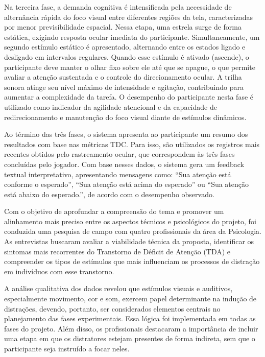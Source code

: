 Na terceira fase, a demanda cognitiva é intensificada pela necessidade de alternância rápida do foco visual entre diferentes regiões da tela, caracterizadas por menor previsibilidade espacial. Nessa etapa, uma estrela surge de forma estática, exigindo resposta ocular imediata do participante. Simultaneamente, um segundo estímulo estático é apresentado, alternando entre os estados ligado e desligado em intervalos regulares. Quando esse estímulo é ativado (ascende), o participante deve manter o olhar fixo sobre ele até que se apague, o que permite avaliar a atenção sustentada e o controle do direcionamento ocular. A trilha sonora atinge seu nível máximo de intensidade e agitação, contribuindo para aumentar a complexidade da tarefa. O desempenho do participante nesta fase é utilizado como indicador da agilidade atencional e da capacidade de redirecionamento e manutenção do foco visual diante de estímulos dinâmicos.

Ao término das três fases, o sistema apresenta ao participante um resumo dos resultados com base nas métricas TDC. Para isso, são utilizados os registros mais recentes obtidos pelo rastreamento ocular, que correspondem às três fases concluídas pelo jogador. Com base nesses dados, o sistema gera um feedback textual interpretativo, apresentando mensagens como: “Sua atenção está conforme o esperado”, “Sua atenção está acima do esperado” ou “Sua atenção está abaixo do esperado.”, de acordo com o desempenho observado.

Com o objetivo de aprofundar a compreensão do tema e promover um alinhamento mais preciso entre os aspectos técnicos e psicológicos do projeto, foi conduzida uma pesquisa de campo com quatro profissionais da área da Psicologia. As entrevistas buscaram avaliar a viabilidade técnica da proposta, identificar os sintomas mais recorrentes do Transtorno de Déficit de Atenção (TDA) e compreender os tipos de estímulos que mais influenciam os processos de distração em indivíduos com esse transtorno.

A análise qualitativa dos dados revelou que estímulos visuais e auditivos, especialmente movimento, cor e som, exercem papel determinante na indução de distrações, devendo, portanto, ser considerados elementos centrais no planejamento das fases experimentais. Essa lógica foi implementada em todas as fases do projeto.
Além disso, os profissionais destacaram a importância de incluir uma etapa em que os distratores estejam presentes de forma indireta, sem que o participante seja instruído a focar neles.

